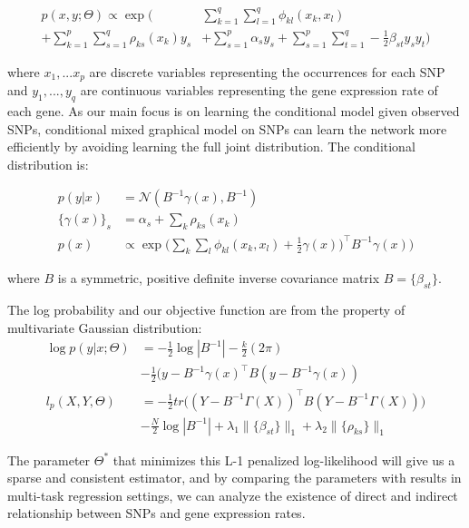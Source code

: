 \documentclass{article}
\begin{document}
\begin{align}
p(x, y ; \Theta) \propto \exp \Big( &\sum_{k=1}^{q} \sum_{l=1}^{q} \phi_{kl} (x_k, x_l) \nonumber \\
+ \sum_{k=1}^{p} \sum_{s=1}^{q} \rho_{ks}(x_k) y_s  &+ \sum_{s=1}^{p} \alpha_s y_s + \sum_{s=1}^{p} \sum_{t=1}^{q} -\frac{1}{2} \beta_{st} y_s y_t \Big)
\end{align} 

where $x_1, ... x_p$ are discrete variables representing the occurrences for each SNP and $y_1, ..., y_q$ are continuous variables representing the gene expression rate of each gene. As our main focus is on learning the conditional model given observed SNPs, conditional mixed graphical model on SNPs can learn the network more efficiently by avoiding learning the full joint distribution. The conditional distribution is:

\begin{align}
p(y|x) &= \mathcal{N}(B^{-1}\gamma(x), B^{-1}) \label{eq:cond_prob}\\
\{\gamma(x)\}_s &= \alpha_s + \sum_{k} \rho_{ks}(x_k) \\
p(x) &\propto \exp \Big( \sum_{k} \sum_{l} \phi_{kl}(x_k, x_l) + \frac{1}{2} \gamma(x))^\intercal B^{-1} \gamma(x) \Big)
\end{align}

where $B$ is a symmetric, positive definite inverse covariance matrix $B = \{ \beta_{st}\}$.

The log probability and our objective function are from the property of multivariate Gaussian distribution:
\begin{align}
\log p(y | x; \Theta) &= -\frac{1}{2}\log |B^{-1}| -\frac{k}{2} (2 \pi) \nonumber    \\
& -\frac{1}{2} (y - B^{-1} \gamma(x)^\intercal B (y - B^{-1} \gamma(x)) \\
l_p(X, Y, \Theta) &= -\frac{1}{2} tr\Big((Y - B^{-1} \Gamma(X))^\intercal B (Y - B^{-1} \Gamma(X)) \Big) \nonumber \\
& -\frac{N}{2} \log|B^{-1}| + \lambda_1 \|\{\beta_{st}\}\|_1 + \lambda_2 \|\{\rho_{ks}\}\|_1 \label{eq:obj}
\end{align}

The parameter $\Theta^*$ that minimizes this L-1 penalized log-likelihood will give us a sparse and consistent estimator, and by comparing the parameters with results in multi-task regression settings, we can analyze the existence of direct and indirect relationship between SNPs and gene expression rates.
\end{document}
